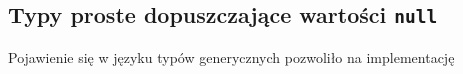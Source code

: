 \subsection{Typy proste dopuszczające wartości {\tt null}}

Pojawienie się w języku typów generycznych pozwoliło na implementację 